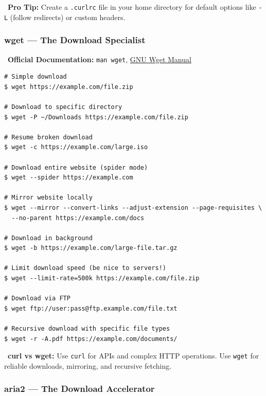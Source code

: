 \documentclass[12pt]{article}
\newcommand{\tipsicon}{\faLightbulb}
\newcommand{\bookicon}{\faBook}
\begin{document}
\begin{infobox}
\tipsicon\ \textbf{Pro Tip:} Create a \texttt{.curlrc} file in your home directory for default options like \texttt{-L} (follow redirects) or custom headers.
\end{infobox}

\subsubsection*{wget — The Download Specialist}

\begin{infobox}
\bookicon\ \textbf{Official Documentation:} \texttt{man wget}, \href{https://www.gnu.org/software/wget/manual/wget.html}{GNU Wget Manual}
\end{infobox}

\begin{highlightbox}
\begin{verbatim}
# Simple download
$ wget https://example.com/file.zip

# Download to specific directory
$ wget -P ~/Downloads https://example.com/file.zip

# Resume broken download
$ wget -c https://example.com/large.iso

# Download entire website (spider mode)
$ wget --spider https://example.com

# Mirror website locally
$ wget --mirror --convert-links --adjust-extension --page-requisites \
  --no-parent https://example.com/docs

# Download in background
$ wget -b https://example.com/large-file.tar.gz

# Limit download speed (be nice to servers!)
$ wget --limit-rate=500k https://example.com/file.zip

# Download via FTP
$ wget ftp://user:pass@ftp.example.com/file.txt

# Recursive download with specific file types
$ wget -r -A.pdf https://example.com/documents/
\end{verbatim}
\end{highlightbox}

\begin{infobox}
\faBalanceScale\ \textbf{curl vs wget:} Use \texttt{curl} for APIs and complex HTTP operations. Use \texttt{wget} for reliable downloads, mirroring, and recursive fetching.
\end{infobox}

\subsubsection*{aria2 — The Download Accelerator}
\end{document}
